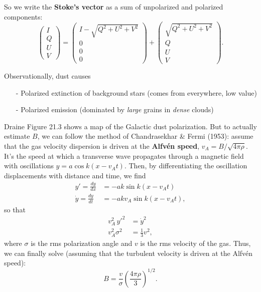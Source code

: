 \documentclass{tufte-handout}
\renewcommand{\textbf}[1]{{\bf \textcolor{dark-gray}{#1}}}
\begin{document}
So we write the \textbf{Stoke's vector} as a sum of unpolarized and polarized components:
\begin{equation}
\begin{pmatrix}
I\\Q\\U\\V
\end{pmatrix} =
\begin{pmatrix}
I-\sqrt{Q^2 + U^2 + V^2}\\0\\0\\0
\end{pmatrix} +
\begin{pmatrix}
\sqrt{Q^2+U^2+V^2}\\Q\\U\\V
\end{pmatrix}.
\end{equation}

Observationally, dust causes
\begin{itemize}
\item[-] Polarized extinction of background stars (comes from everywhere, low value)
\item[-] Polarized emission (dominated by \textit{large} grains in \textit{dense} clouds)
\end{itemize}
Draine Figure 21.3 shows a map of the Galactic dust polarization. But to actually estimate $B$, we can follow the method of Chandrasekhar \& Fermi (1953): assume that the gas velocity dispersion is driven at the \textbf{Alfv\'en speed}, $v_A = B/\sqrt{4\pi \rho}$. It's the speed at which a transverse wave propagates through a magnetic field with oscillations $y = a\cos k (x-v_A t)$. Then, by differentiating the oscillation displacements with distance and time, we find
\begin{align*}
y' =\frac{dy}{dx} &= -ak \sin k(x-v_At)\\
\dot y =\frac{dy}{dt} &= - akv_A \sin k(x-v_At),
\end{align*}
so that \begin{align*}
v_A^2\, y'^2 &= \dot y^2\\
v_A^2 \sigma^2 &= \frac{1}{3}v^2,
\end{align*}
where $\sigma$ is the rms polarization angle and $v$ is the rms velocity of the gas. Thus, we can finally solve (assuming that the turbulent velocity is driven at the Alfv\'en speed):
\begin{equation}
B = \frac{v}{\sigma} \left (\frac{4\pi \rho}{3}\right )^{1/2}.
\end{equation}
\end{document}
